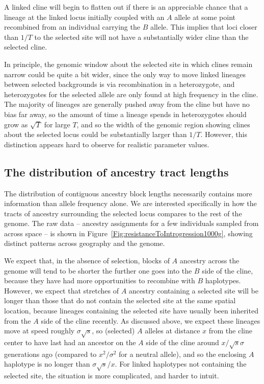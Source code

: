 \documentclass[11pt,letterpaper]{article}
\newcommand{\plr}[1]{{\em \color{blue} #1}}
\begin{document}
A linked cline will begin to flatten out if there is an appreciable chance that a lineage at the linked locus initially coupled with an $A$ allele 
at some point recombined from an individual carrying the $B$ allele.
This implies that loci closer than $1/T$ to the selected site will not have a substantially wider cline than the selected cline.

In principle, the genomic window about the selected site
in which clines remain narrow could be quite a bit wider,
since the only way to move linked lineages between selected backgrounds is via recombination in a heterozygote,
and heterozygotes for the selected allele are only found at high frequency in the cline.
The majority of lineages are generally pushed away from the cline but have no bias far away,
so the amount of time a lineage spends in heterozygotes should grow as $\sqrt{T}$ for large $T$,
and so the width of the genomic region showing clines about the selected locus could be 
substantially larger than $1/T$. However, this distinction appears hard to observe for realistic parameter values.






\subsection*{The distribution of ancestry tract lengths}

The distribution of contiguous ancestry block lengths necessarily contains more information than allele frequency alone. We are interested specifically in how the tracts of ancestry surrounding the selected locus compares to the rest of the genome. 
The raw data -- ancestry assignments for a few individuals sampled from across space --
is shown in Figure~\ref{Fig:resistanceToIntrogression1000g},
showing distinct patterns across geography and the genome.

We expect that, in the absence of selection, blocks of $A$ ancestry across the genome 
will tend to be shorter the further one goes into the $B$ side of the cline,
because they have had more opportunities to recombine with $B$ haplotypes. 
However, we expect that stretches of $A$ ancestry containing a selected site will be longer
than those that do not contain the selected site at the same spatial location,
because lineages containing the selected site have usually been inherited from the $A$ side of the cline recently. 
As discussed above, we expect these lineages move at speed roughly $\sigma\sqrt{s}$,
so (selected) $A$ alleles at distance $x$ from the cline center
to have last had an ancestor on the $A$ side of the cline around $x /\sqrt{s}\sigma$ generations ago 
(compared to $x^2/\sigma^2$ for a neutral allele),
and so the enclosing $A$ haplotype is no longer than $\sigma\sqrt{s}/x $.
For linked haplotypes not containing the selected site, the situation is more complicated, and harder to intuit.
\end{document}
